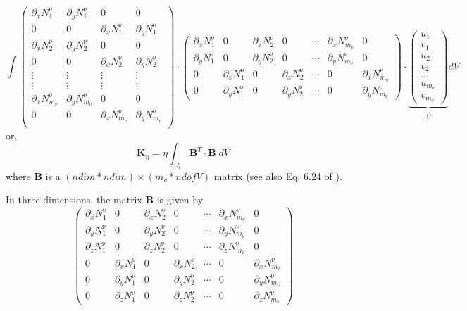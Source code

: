 \[
\int
\left(
\begin{array}{cccc}
\partial_x N_1^\upnu & \partial_y N_1^\upnu & 0 & 0 \\ 
0 & 0 & \partial_x N_1^\upnu & \partial_y N_1^\upnu  \\ 
\partial_x N_2^\upnu & \partial_y N_2^\upnu & 0 & 0 \\ 
0 & 0 & \partial_x N_2^\upnu & \partial_y N_2^\upnu  \\ 
\vdots & \vdots & \vdots & \vdots \\
\vdots & \vdots & \vdots & \vdots \\
\partial_x N_{m_\upnu}^\upnu & \partial_y N_{m_\upnu}^\upnu & 0 & 0 \\ 
0 & 0 & \partial_x N_{m_\upnu}^\upnu & \partial_y N_{m_\upnu}^\upnu  \\ 
\end{array}
\right)
\cdot
\left(
\begin{array}{cccccccccc}
\partial_x N_1^\upnu & 0  & \partial_x N_2^\upnu & 0  & \cdots & \partial_x N^\upnu_{m_\upnu} & 0 \\
\partial_y N_1^\upnu & 0  & \partial_y N_2^\upnu & 0  & \cdots & \partial_y N^\upnu_{m_\upnu} & 0 \\
0 & \partial_x N_1^\upnu  & 0& \partial_x N_2^\upnu  & \cdots & 0 & \partial_x N^\upnu_{m_\upnu}  \\
0 & \partial_y N_1^\upnu  & 0& \partial_y N_2^\upnu  & \cdots & 0 & \partial_y N^\upnu_{m_\upnu}  
\end{array}
\right) 
\cdot
\underbrace{
\left(
\begin{array}{c}
u_1 \\ v_1 \\ u_2 \\ v_2 \\ \dots \\ u_{m_v} \\ v_{m_v} 
\end{array}
\right) }_{\vec V}
dV
\]
or, 
\[
{\bm K}_\eta= \eta \int_{\Omega_e} {\bm B}^T  \cdot {\bm B} \; dV 
\]
where ${\bm B}$ is a $(ndim*ndim) \times (m_v*ndofV)$ matrix (see also Eq. 6.24 of \cite{dohu03}). 

In three dimensions, the matrix ${\bm B}$ is given by
\[
\left(
\begin{array}{cccccccccc}
\partial_x N_1^\upnu & 0  & \partial_x N_2^\upnu & 0  & \cdots & \partial_x N^\upnu_{m_\upnu} & 0 \\
\partial_y N_1^\upnu & 0  & \partial_y N_2^\upnu & 0  & \cdots & \partial_y N^\upnu_{m_\upnu} & 0 \\
\partial_z N_1^\upnu & 0  & \partial_z N_2^\upnu & 0  & \cdots & \partial_z N^\upnu_{m_\upnu} & 0 \\
0 & \partial_x N_1^\upnu  & 0& \partial_x N_2^\upnu  & \cdots & 0 & \partial_x N^\upnu_{m_\upnu}  \\
0 & \partial_y N_1^\upnu  & 0& \partial_y N_2^\upnu  & \cdots & 0 & \partial_y N^\upnu_{m_\upnu}  \\
0 & \partial_z N_1^\upnu  & 0& \partial_z N_2^\upnu  & \cdots & 0 & \partial_z N^\upnu_{m_\upnu}  
\end{array}
\right) 
\]



